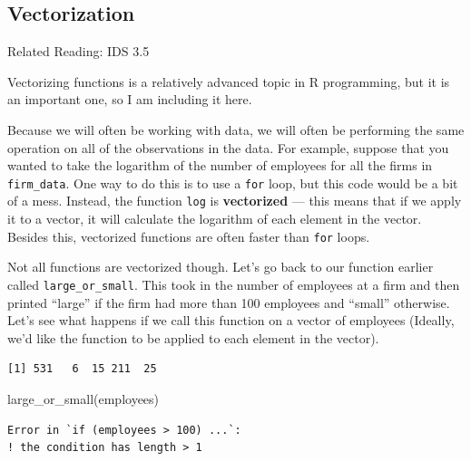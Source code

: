 \documentclass[
  letterpaper,
  DIV=11,
  numbers=noendperiod]{scrreprt}
\newenvironment{Shaded}{\begin{snugshade}}{\end{snugshade}}
\newcommand{\FunctionTok}[1]{\textcolor[rgb]{0.28,0.35,0.67}{#1}}
\newcommand{\NormalTok}[1]{\textcolor[rgb]{0.00,0.23,0.31}{#1}}
\newcommand{\OtherTok}[1]{\textcolor[rgb]{0.00,0.23,0.31}{#1}}
\newcommand{\SpecialCharTok}[1]{\textcolor[rgb]{0.37,0.37,0.37}{#1}}
\begin{document}
\subsection{Vectorization}\label{vectorization}

Related Reading: IDS 3.5

Vectorizing functions is a relatively advanced topic in R programming,
but it is an important one, so I am including it here.

Because we will often be working with data, we will often be performing
the same operation on all of the observations in the data. For example,
suppose that you wanted to take the logarithm of the number of employees
for all the firms in \texttt{firm\_data}. One way to do this is to use a
\texttt{for} loop, but this code would be a bit of a mess. Instead, the
function \texttt{log} is \textbf{vectorized} --- this means that if we
apply it to a vector, it will calculate the logarithm of each element in
the vector. Besides this, vectorized functions are often faster than
\texttt{for} loops.

Not all functions are vectorized though. Let's go back to our function
earlier called \texttt{large\_or\_small}. This took in the number of
employees at a firm and then printed ``large'' if the firm had more than
100 employees and ``small'' otherwise. Let's see what happens if we call
this function on a vector of employees (Ideally, we'd like the function
to be applied to each element in the vector).

\begin{Shaded}
\end{Shaded}

\begin{verbatim}
[1] 531   6  15 211  25
\end{verbatim}

\begin{Shaded}
\begin{Highlighting}[]
\FunctionTok{large\_or\_small}\NormalTok{(employees)}
\end{Highlighting}
\end{Shaded}

\begin{verbatim}
Error in `if (employees > 100) ...`:
! the condition has length > 1
\end{verbatim}
\end{document}

